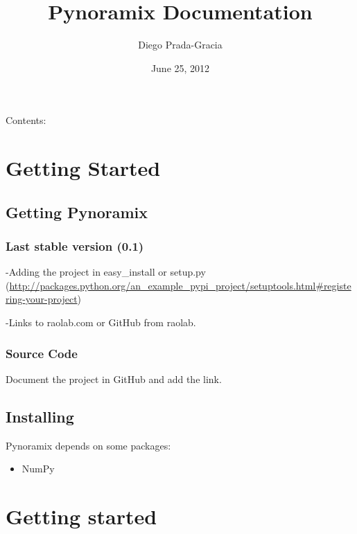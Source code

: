 \documentclass[letterpaper,10pt,english]{sphinxmanual}
\title{Pynoramix Documentation}
\date{June 25, 2012}
\author{Diego Prada-Gracia}
\begin{document}
\maketitle
\tableofcontents
{}\label{index::doc}


Contents:


\chapter{Getting Started}
\label{getting_started:getting-started}\label{getting_started::doc}\label{getting_started:welcome-to-pynoramix-s-documentation}

\section{Getting Pynoramix}
\label{getting_started:getting-pynoramix}

\subsection{Last stable version (0.1)}
\label{getting_started:last-stable-version-0-1}
-Adding the project in easy\_install or setup.py (\href{http://packages.python.org/an\_example\_pypi\_project/setuptools.html\#registering-your-project}{http://packages.python.org/an\_example\_pypi\_project/setuptools.html\#registering-your-project})

-Links to raolab.com or GitHub from raolab.


\subsection{Source Code}
\label{getting_started:source-code}
Document the project in GitHub and add the link.


\section{Installing}
\label{getting_started:installing}
Pynoramix depends on some packages:
\begin{itemize}
\item {} 
NumPy

\end{itemize}


\chapter{Getting started}
\label{getting_started_ex:getting-started}\label{getting_started_ex::doc}\label{getting_started_ex:id1}
\end{document}
